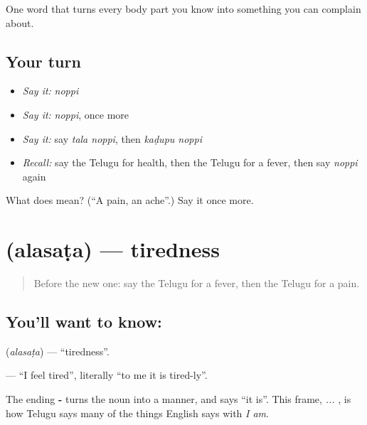 \begin{grammarlens}[title={What you've built}]
One word that turns every body part you know into something you can complain about.
\end{grammarlens}

\subsection*{Your turn}
\begin{itemize}
\raggedright
  \item \emph{Say it:} \emph{noppi}
  \item \emph{Say it:} \emph{noppi}, once more
  \item \emph{Say it:} say \emph{tala noppi}, then \emph{kaḍupu noppi}
  \item \emph{Recall:} say the Telugu for health, then the Telugu for a fever, then say \emph{noppi} again
\end{itemize}

\begin{tcolorbox}[breakable,colback=teal!4,colframe=teal!35!black,title={Before you move on}]
What does  mean? (\textquotedblleft{}A pain, an ache\textquotedblright{}.) Say it once more.
\end{tcolorbox}
\section[\texorpdfstring{\te{అలసట} (alasaṭa)}{అలసట (alasaṭa)}]{ (alasaṭa) — tiredness}

\label{lesson:TE-C84-tiredness}



\begin{quote}
Before the new one: say the Telugu for a fever, then the Telugu for a pain.
\end{quote}

\subsection*{You'll want to know: }
\textbf{} (\emph{alasaṭa}) — \textquotedblleft{}tiredness\textquotedblright{}.

\textbf{  } — \textquotedblleft{}I feel tired\textquotedblright{}, literally \textquotedblleft{}to me it is tired-ly\textquotedblright{}.

The ending \textbf{-} turns the noun into a manner, and \textbf{} says \textquotedblleft{}it is\textquotedblright{}. This frame, \emph{ ...  }, is how Telugu says many of the things English says with \emph{I am}.

